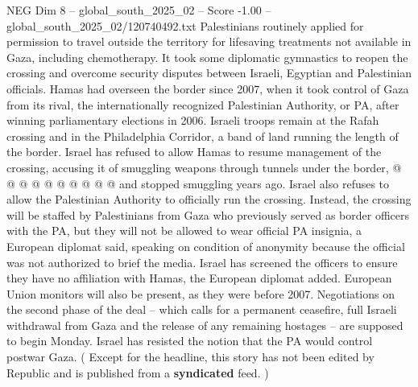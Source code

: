 \begin{textsample}{NEG Dim 8 – global\_south\_2025\_02 – Score -1.00 – global\_south\_2025\_02/120740492.txt}
Palestinians routinely applied for permission to travel outside the territory for lifesaving treatments not available in Gaza, including chemotherapy.
It took some diplomatic gymnastics to reopen the crossing and overcome security disputes between Israeli, Egyptian and Palestinian officials.
Hamas had overseen the border since 2007, when it took control of Gaza from its rival, the internationally recognized Palestinian Authority, or PA, after winning parliamentary elections in 2006.
Israeli troops remain at the Rafah crossing and in the Philadelphia Corridor, a band of land running the length of the border.
Israel has refused to allow Hamas to resume management of the crossing, accusing it of smuggling weapons through tunnels under the border, @ @ @ @ @ @ @ @ @ @ and stopped smuggling years ago.
Israel also refuses to allow the Palestinian Authority to officially run the crossing.
Instead, the crossing will be staffed by Palestinians from Gaza who previously served as border officers with the PA, but they will not be allowed to wear official PA insignia, a European diplomat said, speaking on condition of anonymity because the official was not authorized to brief the media.
Israel has screened the officers to ensure they have no affiliation with Hamas, the European diplomat added.
European Union monitors will also be present, as they were before 2007.
Negotiations on the second phase of the deal -- which calls for a permanent ceasefire, full Israeli withdrawal from Gaza and the release of any remaining hostages -- are supposed to begin Monday.
Israel has resisted the notion that the PA would control postwar Gaza. ( Except for the headline, this story has not been edited by Republic and is published from a \textbf{syndicated} feed. )

\end{textsample}

